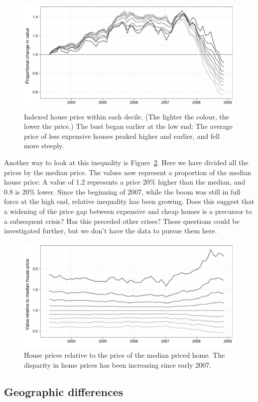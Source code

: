 \documentclass[oneside]{article}
\begin{document}
\begin{figure}[htbp]
  \centering
  \includegraphics[width=0.75\linewidth]{decile-ind}
  \caption{Indexed house price within each decile. (The lighter the colour, the lower the price.)  The bust began earlier at the low end: The average price of less expensive houses peaked higher and earlier, and fell more steeply.}
  \label{fig:decile-ind}
\end{figure}

Another way to look at this inequality is Figure~\ref{fig:decile-rel}.  Here we have divided all the prices by the median price.  The values now represent a proportion of the median house price: A value of 1.2 represents a price 20\% higher than the median, and 0.8 is 20\% lower. Since the beginning of 2007, while the boom was still in full force at the high end, relative inequality has been growing.  Does this suggest that a widening of the price gap between expensive and cheap homes is a precursor to a subsequent crisis? Has this preceded other crises? These questions could be investigated further, but we don't have the data to pursue them here.

\begin{figure}[htbp]
  \centering
  \includegraphics[width=0.75\linewidth]{decile-rel}
  \caption{House prices relative to the price of the median priced home.  The disparity in home prices has been increasing since early 2007.}
  \label{fig:decile-rel}
\end{figure}

\subsection{Geographic differences}
\end{document}
